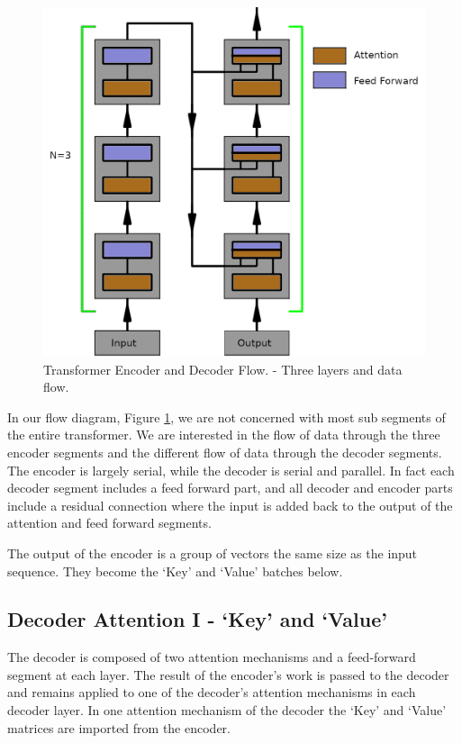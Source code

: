 \begin{figure}[H]
	\begin{center}
		
		
		\includegraphics[scale=1.0]{diagram-flow1}
	\end{center}
	\caption[Transformer Encoder and Decoder Flow]{Transformer Encoder and Decoder Flow. - Three layers and data flow.}
	\label{diagram-flow1}
	
\end{figure}

In our flow diagram, Figure \ref{diagram-flow1}, we are not concerned with most sub segments of the entire transformer. We are interested in the flow of data through the three encoder segments and the different flow of data through the decoder segments. The encoder is largely serial, while the decoder is serial and parallel. In fact each decoder segment includes a feed forward part, and all decoder and encoder parts include a residual connection where the input is added back to the output of the attention and feed forward segments.

The output of the encoder is a group of vectors the same size as the input sequence. They become the `Key' and `Value' batches below.

\subsection{Decoder Attention I - `Key' and `Value'}
The decoder is composed of two attention mechanisms and a feed-forward segment at each layer. The result of the encoder's work is passed to the decoder and remains applied to one of the decoder's attention mechanisms in each decoder layer. In one attention mechanism of the decoder the `Key' and `Value' matrices are imported from the encoder. 


